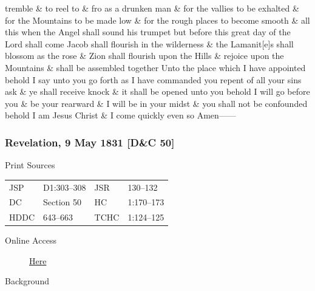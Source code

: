tremble \& to reel to \& fro as a drunken man \& for the vallies to be exhalted \& for the Mountains to be made low \& for the rough places to become smooth \& all this when the Angel shall sound his trumpet but before this great day of the Lord shall come Jacob shall flourish in the wilderness \& the Lamanit[e]s shall blossom as the rose \& Zion shall flourish upon the Hills \& rejoice upon the Mountains \& shall be assembled together Unto the place which I have appointed behold I say unto you go forth as I have commanded you repent of all your sins ask \& ye shall receive knock \& it shall be opened unto you behold I will go before you \& be your rearward \& I will be in your midst \& you shall not be confounded behold I am Jesus Christ \& I come quickly even so Amen------
				
		\subsubsection{Revelation, 9 May 1831 [D\&C 50]}
			\label{EMS-1831-JS-9-MAY-1831}
		
			\begin{description}
				\item[Print Sources]
			\end{description}

				\begin{tabular}{p{0.5in}p{1in}p{0.5in}p{1in}}
				JSP	 	& D1:303--308	& JSR 		& 130--132 \\
				DC	 	& Section 50 	& HC 		& 1:170--173 \\
				HDDC 	& 643--663		& TCHC 		& 1:124--125 \\
				\end{tabular}
			
			\begin{description}
				\item[Online Access] \href{https://www.josephsmithpapers.org/paper-summary/revelation-9-may-1831-dc-50/1}{Here}
			\end{description}
			
			\begin{description}
				\item[Background]
			\end{description}
			
			
